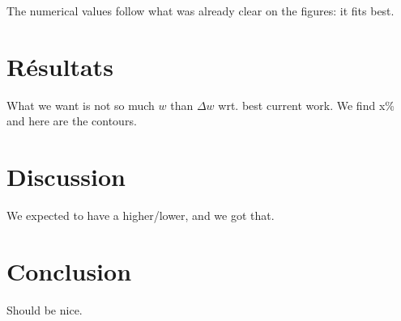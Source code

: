 \documentclass[../main/main.tex]{subfiles}
\begin{document}
The numerical values follow what was already clear on the figures: it fits best.

\section{Résultats}\label{sec:simres}
What we want is not so much $w$ than $\Delta w$ wrt. best current work. We find
x\% and here are the contours.

\section{Discussion}\label{sec:simdisc}
We expected to have a higher/lower, and we got that.

\section{Conclusion}\label{sec:simccl}

Should be nice.


\clearpage

\thispagestyle{plain}
\vfill
\minilof
\vfill
\minilot
\vfill

% 
% 
\end{document}
